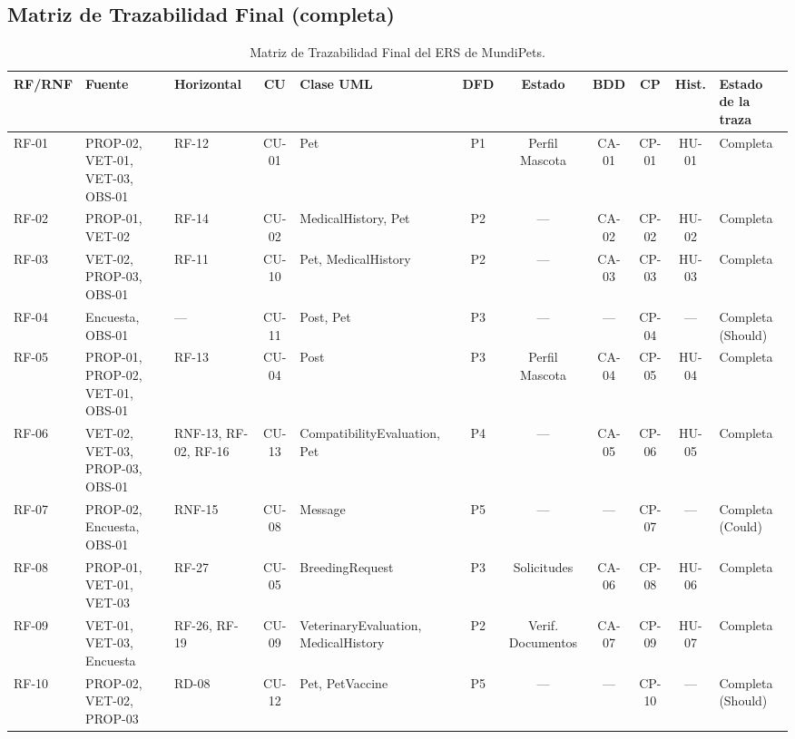 \documentclass[journal,onecolumn]{IEEEtran}
\begin{document}
	\clearpage
	\begin{landscape}
		\section{Matriz de Trazabilidad Final (completa)}
		\label{app:matriz}
		
			\begin{table}[H]
			\centering
			\caption{Matriz de Trazabilidad Final del ERS de MundiPets.}
			\label{tab:matriz_final}
			\tiny
			\begin{tabularx}{\linewidth}{|l|X|X|c|X|c|c|c|c|c|X|}
				\hline
				\textbf{RF/RNF} & \textbf{Fuente} & \textbf{Horizontal} & \textbf{CU} & \textbf{Clase UML} & \textbf{DFD} & \textbf{Estado} & \textbf{BDD} & \textbf{CP} & \textbf{Hist.} & \textbf{Estado de la traza} \\
				\hline
				RF-01 & PROP-02, VET-01, VET-03, OBS-01 & RF-12 & CU-01 & Pet & P1 & Perfil Mascota & CA-01 & CP-01 & HU-01 & Completa \\ \hline
				RF-02 & PROP-01, VET-02 & RF-14 & CU-02 & MedicalHistory, Pet & P2 & --- & CA-02 & CP-02 & HU-02 & Completa \\ \hline
				RF-03 & VET-02, PROP-03, OBS-01 & RF-11 & CU-10 & Pet, MedicalHistory & P2 & --- & CA-03 & CP-03 & HU-03 & Completa \\ \hline
				RF-04 & Encuesta, OBS-01 & --- & CU-11 & Post, Pet & P3 & --- & --- & CP-04 & --- & Completa (Should) \\ \hline
				RF-05 & PROP-01, PROP-02, VET-01, OBS-01 & RF-13 & CU-04 & Post & P3 & Perfil Mascota & CA-04 & CP-05 & HU-04 & Completa \\ \hline
				RF-06 & VET-02, VET-03, PROP-03, OBS-01 & RNF-13, RF-02, RF-16 & CU-13 & CompatibilityEvaluation, Pet & P4 & --- & CA-05 & CP-06 & HU-05 & Completa \\ \hline
				RF-07 & PROP-02, Encuesta, OBS-01 & RNF-15 & CU-08 & Message & P5 & --- & --- & CP-07 & --- & Completa (Could) \\ \hline
				RF-08 & PROP-01, VET-01, VET-03 & RF-27 & CU-05 & BreedingRequest & P3 & Solicitudes & CA-06 & CP-08 & HU-06 & Completa \\ \hline
				RF-09 & VET-01, VET-03, Encuesta & RF-26, RF-19 & CU-09 & VeterinaryEvaluation, MedicalHistory & P2 & Verif. Documentos & CA-07 & CP-09 & HU-07 & Completa \\ \hline
				RF-10 & PROP-02, VET-02, PROP-03 & RD-08 & CU-12 & Pet, PetVaccine & P5 & --- & --- & CP-10 & --- & Completa (Should) \\ \hline

\end{tabularx}
\end{table}
\end{landscape}
\end{document}
